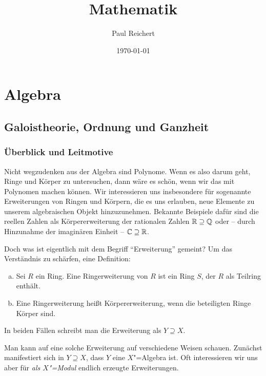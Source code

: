 \documentclass[ngerman, 11pt, a4paper, twoside, abstracton]{scrbook}
\begin{document}
\title{Mathematik}
\author{Paul Reichert}
\date{\today}

\maketitle

\chapter{Algebra}

\section{Galoistheorie, Ordnung und Ganzheit}

\subsection{Überblick und Leitmotive}

Nicht wegzudenken aus der Algebra sind Polynome. Wenn es also darum geht, Ringe und Körper zu untersuchen, dann wäre es schön, wenn wir das mit Polynomen machen können. Wir interessieren uns insbesondere für sogenannte Erweiterungen von Ringen und Körpern, die es uns erlauben, neue Elemente zu unserem algebraischen Objekt hinzuzunehmen. Bekannte Beispiele dafür sind die reellen Zahlen als Körpererweiterung der rationalen Zahlen $\mathbb{R}\supseteq\mathbb{Q}$ oder -- durch Hinzunahme der imaginären Einheit -- $\mathbb{C}\supseteq\mathbb{R}$.

Doch was ist eigentlich mit dem Begriff \enquote{Erweiterung} gemeint? Um das Verständnis zu schärfen, eine Definition:

\begin{definition}[Erweiterung]
  \begin{enumerate}[(a)]
    \item Sei $R$ ein Ring. Eine Ringerweiterung von $R$ ist ein Ring $S$, der $R$ als Teilring enthält.
    \item Eine Ringerweiterung heißt Körpererweiterung, wenn die beteiligten Ringe Körper sind.
  \end{enumerate}

  In beiden Fällen schreibt man die Erweiterung als $Y\supseteq X$.
\end{definition}

Man kann auf eine solche Erweiterung auf verschiedene Weisen schauen. Zunächst manifestiert sich in $Y\supseteq X$, dass $Y$ eine $X$"=Algebra ist. Oft interessieren wir uns aber für \emph{als $X$"=Modul} endlich erzeugte Erweiterungen.
\end{document}
